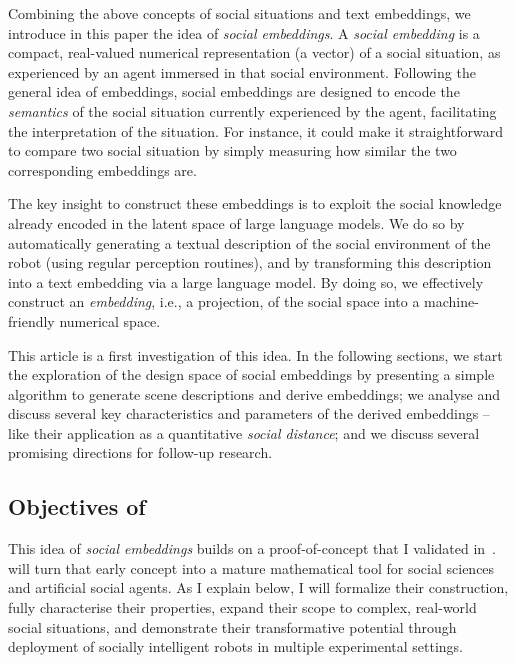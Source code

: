 \begin{rewrite}
Combining the above concepts of social situations and text embeddings, we introduce in
this paper the idea of \emph{social embeddings}. A \emph{social embedding} is a
compact, real-valued numerical representation (a vector) of a social
situation, as experienced by an agent immersed in that social environment.
Following the general idea of embeddings, social embeddings are designed
to encode the \emph{semantics} of the social situation currently experienced by
the agent, facilitating the interpretation of the situation. For instance, it
could make it straightforward to compare two social situation by simply
measuring how similar the two corresponding embeddings are.

The key insight to construct these embeddings is to exploit the social knowledge
already encoded in the latent space of large language models. We do so by
automatically generating a textual description of the social environment of the
robot (using regular perception routines), and by transforming this
description into a text embedding via a large language model. By doing so, we
effectively construct an \emph{embedding}, i.e., a projection, of the social
space into a machine-friendly numerical space.

This article is a first investigation of this idea. In the following sections,
we start the exploration of the design space of social embeddings by presenting
a simple algorithm to generate scene descriptions and derive embeddings; we
analyse and discuss several key characteristics and parameters of the derived
embeddings -- like their application as a quantitative \emph{social distance};
and we discuss several promising directions for follow-up research.

\end{rewrite}

\subsection{Objectives of \project}
\label{sec:objectives}


This idea of \emph{social embeddings} builds on a proof-of-concept that I
validated in~\cite{lemaignan2024social}. \project will turn that early concept
into a mature mathematical tool for social sciences and artificial social
agents. As I explain below, I will formalize their construction,  fully
characterise their properties, expand their scope to complex, real-world social
situations, and demonstrate their transformative potential through deployment of
socially intelligent robots in multiple experimental settings.

